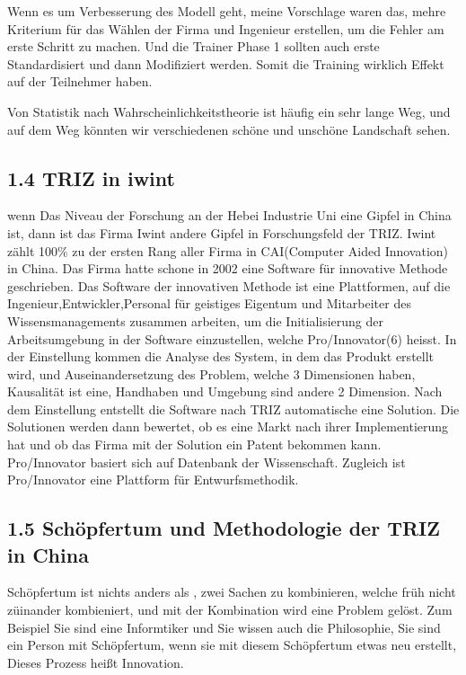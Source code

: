 \documentclass[11pt,a4paper]{article}
\begin{document}
Wenn es um Verbesserung des Modell geht, meine Vorschlage waren das, mehre
Kriterium für das Wählen der Firma und Ingenieur erstellen, um die Fehler am
erste Schritt zu machen. Und die Trainer Phase 1 sollten auch erste
Standardisiert und dann Modifiziert werden. Somit die Training wirklich Effekt
auf der Teilnehmer haben.

Von Statistik nach Wahrscheinlichkeitstheorie ist häufig ein sehr lange Weg,
und auf dem Weg könnten wir verschiedenen schöne und unschöne Landschaft
sehen.

\subsection{1.4 TRIZ in iwint}
wenn Das Niveau der Forschung an der Hebei Industrie Uni eine Gipfel in China
ist, dann ist das Firma Iwint andere Gipfel in Forschungsfeld der TRIZ. Iwint
zählt 100\% zu der ersten Rang aller Firma in CAI(Computer Aided Innovation)
in China.  Das Firma hatte schone in 2002 eine Software für innovative
Methode geschrieben. Das Software der innovativen Methode ist eine
Plattformen, auf die Ingenieur,Entwickler,Personal für geistiges Eigentum und
Mitarbeiter des Wissensmanagements zusammen arbeiten, um die Initialisierung
der Arbeitsumgebung in der Software einzustellen, welche Pro/Innovator(6)
heisst. In der Einstellung kommen die Analyse des System, in dem das Produkt
erstellt wird, und Auseinandersetzung des Problem, welche 3 Dimensionen haben,
Kausalität ist eine, Handhaben und Umgebung sind andere 2 Dimension.  Nach dem
Einstellung entstellt die Software nach TRIZ automatische eine Solution. Die
Solutionen werden dann bewertet, ob es eine Markt nach ihrer Implementierung
hat und ob das Firma mit der Solution ein Patent bekommen kann. Pro/Innovator
basiert sich auf Datenbank der Wissenschaft. Zugleich ist Pro/Innovator eine
Plattform für Entwurfsmethodik.

\subsection{1.5  Schöpfertum  und Methodologie der TRIZ in China}
Schöpfertum ist nichts anders als , zwei Sachen zu kombinieren, welche früh
nicht züinander kombieniert, und mit  der Kombination wird eine Problem
gelöst. Zum Beispiel Sie sind eine Informtiker und Sie wissen auch die
Philosophie, Sie sind ein Person mit Schöpfertum, wenn sie mit diesem
Schöpfertum etwas neu erstellt, Dieses Prozess heißt Innovation. 
\end{document}

